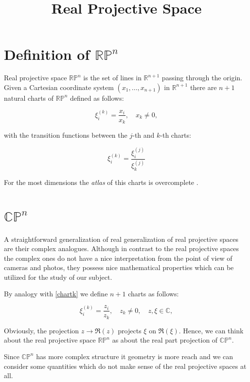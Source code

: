 \documentclass[a4paper,10pt]{article}
\title{Real Projective Space}
\author{}
\date{}
\begin{document}
\maketitle
\section{Definition of $\mathbb{RP}^n$}

Real projective space $\mathbb{RP}^n$ is the set of lines in $\mathbb{R}^{n+1}$ passing through the origin. Given a Cartesian coordinate system $(x_1,\ldots, x_{n+1})$ in $\mathbb{R}^{n+1}$ there are $n+1$ natural charts of $\mathbb{RP}^n$ defined as follows:

\begin{equation}
 \xi_i^{(k)} = \frac{x_i}{x_k}, \quad x_k\neq 0 \label{chartk},
\end{equation}

with the transition functions between the $j$-th and $k$-th charts:

\begin{equation}
 \xi^{(k)}_i = \frac{\xi^{(j)}_i }{\xi^{(j)}_k }
\end{equation}

For the most dimensions the {\it atlas } of this charts is overcomplete \cite{mhopkins}.

\section{$\mathbb{CP}^n$}

A straightforward generalization of real generalization of real projective spaces are their complex analogues. Although in contrast to the real projective spaces the complex ones do not have a nice interpretation from the point of view of cameras and photos, they possess nice mathematical properties which can be utilized for the study of our subject. 

By analogy with \eqref{chartk} we define $n+1$ charts as follows:

\begin{equation}
 \xi_i^{(k)} = \frac{z_i}{z_k}, \quad z_k\neq 0, \quad z, \xi \in \mathbb{C} \label{cchartk},
\end{equation}

Obviously, the projection $z\to \Re{(z)}$ projects $\xi$ on $\Re{(\xi)}$. Hence, we can think about the real projective space $\mathbb{RP}^n$ as about the real part projection of $\mathbb{CP}^n$. 

Since $\mathbb{CP}^n$ has more complex structure it geometry is more reach and we can consider some quantities which do not make sense of the real projective spaces at all.
\end{document}
